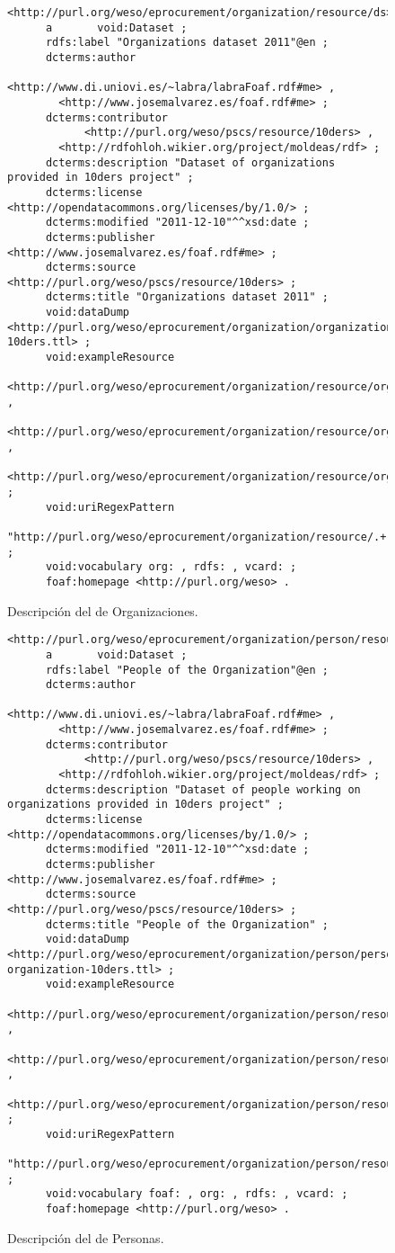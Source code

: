 \begin{figure}[!htp]
\begin{lstlisting} 
<http://purl.org/weso/eprocurement/organization/resource/ds>
      a       void:Dataset ;
      rdfs:label "Organizations dataset 2011"@en ;
      dcterms:author 
            <http://www.di.uniovi.es/~labra/labraFoaf.rdf#me> , 
	    <http://www.josemalvarez.es/foaf.rdf#me> ;
      dcterms:contributor
            <http://purl.org/weso/pscs/resource/10ders> ,
	    <http://rdfohloh.wikier.org/project/moldeas/rdf> ;
      dcterms:description "Dataset of organizations provided in 10ders project" ;
      dcterms:license <http://opendatacommons.org/licenses/by/1.0/> ;
      dcterms:modified "2011-12-10"^^xsd:date ;
      dcterms:publisher <http://www.josemalvarez.es/foaf.rdf#me> ;
      dcterms:source <http://purl.org/weso/pscs/resource/10ders> ;
      dcterms:title "Organizations dataset 2011" ;
      void:dataDump <http://purl.org/weso/eprocurement/organization/organization-10ders.ttl> ;
      void:exampleResource
        <http://purl.org/weso/eprocurement/organization/resource/org1> , 
	<http://purl.org/weso/eprocurement/organization/resource/org2> , 
	<http://purl.org/weso/eprocurement/organization/resource/org3> ;
      void:uriRegexPattern
        "http://purl.org/weso/eprocurement/organization/resource/.+" ;
      void:vocabulary org: , rdfs: , vcard: ;
      foaf:homepage <http://purl.org/weso> .
\end{lstlisting}
	\caption{Descripción del \dataset de Organizaciones.}
	\label{fig:orgs-ds}
\end{figure}
\cleardoublepage
\begin{figure}[!htp]
\begin{lstlisting} 
<http://purl.org/weso/eprocurement/organization/person/resource/ds>
      a       void:Dataset ;
      rdfs:label "People of the Organization"@en ;
      dcterms:author 
            <http://www.di.uniovi.es/~labra/labraFoaf.rdf#me> , 
	    <http://www.josemalvarez.es/foaf.rdf#me> ;
      dcterms:contributor
            <http://purl.org/weso/pscs/resource/10ders> ,
	    <http://rdfohloh.wikier.org/project/moldeas/rdf> ;
      dcterms:description "Dataset of people working on organizations provided in 10ders project" ;
      dcterms:license <http://opendatacommons.org/licenses/by/1.0/> ;
      dcterms:modified "2011-12-10"^^xsd:date ;
      dcterms:publisher <http://www.josemalvarez.es/foaf.rdf#me> ;
      dcterms:source <http://purl.org/weso/pscs/resource/10ders> ;
      dcterms:title "People of the Organization" ;
      void:dataDump <http://purl.org/weso/eprocurement/organization/person/person-organization-10ders.ttl> ;
      void:exampleResource
        <http://purl.org/weso/eprocurement/organization/person/resource/p1> , 
	<http://purl.org/weso/eprocurement/organization/person/resource/p2> , 
	<http://purl.org/weso/eprocurement/organization/person/resource/p3> ;
      void:uriRegexPattern
        "http://purl.org/weso/eprocurement/organization/person/resource/.+" ;
      void:vocabulary foaf: , org: , rdfs: , vcard: ;
      foaf:homepage <http://purl.org/weso> .
\end{lstlisting}
	\caption{Descripción del \dataset de Personas.}
	\label{fig:people-ds}
\end{figure}


